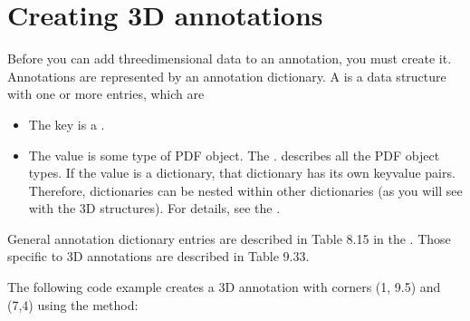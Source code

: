 \documentclass[letterpaper,12pt,english,openany,oneside]{sphinxmanual}
\begin{document}
\section{Creating 3D annotations}
\label{\detokenize{Plugins_3D_samples:creating-3d-annotations}}
Before you can add three\sphinxhyphen{}dimensional data to an annotation, you must create it. Annotations are represented by an annotation dictionary. A  is a data structure with one or more entries, which are 
\begin{itemize}
\item {} 
The key is a .

\item {} 
The value is some type of PDF object. The . describes all the PDF object types. If the value is a dictionary, that dictionary has its own key\sphinxhyphen{}value pairs. Therefore, dictionaries can be nested within other dictionaries (as you will see with the 3D structures). For details, see the .

\end{itemize}

General annotation dictionary entries are described in Table 8.15 in the . Those specific to 3D annotations are described in Table 9.33.

The following code example creates a 3D annotation with corners (1, 9.5) and (7,4) using the  method:

\begin{sphinxVerbatim}[commandchars=\\\{\}]
 
     
      
    
   

      
\end{sphinxVerbatim}
\end{document}
